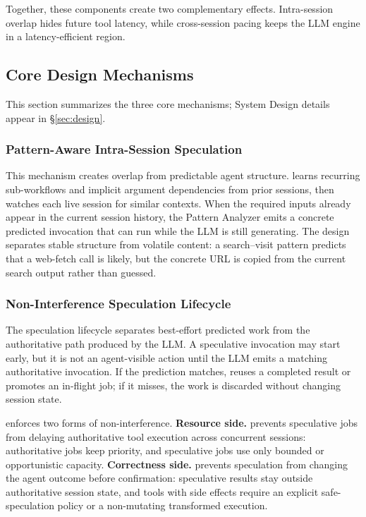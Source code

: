 Together, these components create two complementary effects.
Intra-session overlap hides future tool latency, while cross-session pacing keeps the LLM engine in a latency-efficient region.

\subsection{Core Design Mechanisms}
\label{sec:overview-mechanisms}

This section summarizes the three core mechanisms; System Design details appear in \S\ref{sec:design}.

\subsubsection{Pattern-Aware Intra-Session Speculation}
\label{sec:overview-pattern-spec}

This mechanism creates overlap from predictable agent structure.
\sys learns recurring sub-workflows and implicit argument dependencies from prior sessions, then watches each live session for similar contexts.
When the required inputs already appear in the current session history, the Pattern Analyzer emits a concrete predicted invocation that can run while the LLM is still generating.
The design separates stable structure from volatile content: a search--visit pattern predicts that a web-fetch call is likely, but the concrete URL is copied from the current search output rather than guessed.

\subsubsection{Non-Interference Speculation Lifecycle}
\label{sec:overview-spec-lifecycle}

The speculation lifecycle separates best-effort predicted work from the authoritative path produced by the LLM.
A speculative invocation may start early, but it is not an agent-visible action until the LLM emits a matching authoritative invocation.
If the prediction matches, \sys reuses a completed result or promotes an in-flight job; if it misses, the work is discarded without changing session state.

\sys enforces two forms of non-interference.
\textbf{Resource side.} \sys prevents speculative jobs from delaying authoritative tool execution across concurrent sessions: authoritative jobs keep priority, and speculative jobs use only bounded or opportunistic capacity.
\textbf{Correctness side.} \sys prevents speculation from changing the agent outcome before confirmation: speculative results stay outside authoritative session state, and tools with side effects require an explicit safe-speculation policy or a non-mutating transformed execution.

